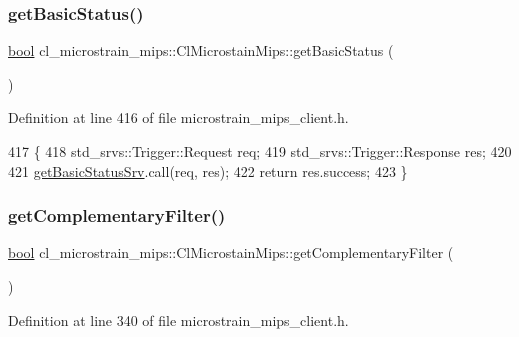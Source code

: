 \subsubsection{\texorpdfstring{get\+Basic\+Status()}{getBasicStatus()}}
{\footnotesize\ttfamily \hyperlink{classbool}{bool} cl\+\_\+microstrain\+\_\+mips\+::\+Cl\+Microstain\+Mips\+::get\+Basic\+Status (\begin{DoxyParamCaption}{ }\end{DoxyParamCaption})\hspace{0.3cm}{\ttfamily [inline]}}



Definition at line 416 of file microstrain\+\_\+mips\+\_\+client.\+h.


\begin{DoxyCode}
417     \{
418         std\_srvs::Trigger::Request req;
419         std\_srvs::Trigger::Response res;
420 
421         \hyperlink{classcl__microstrain__mips_1_1ClMicrostainMips_ab2d9efccc6237800a890135a4249eaf8}{getBasicStatusSrv}.call(req, res);
422         \textcolor{keywordflow}{return} res.success;
423     \}
\end{DoxyCode}
\mbox{\label{classcl__microstrain__mips_1_1ClMicrostainMips_aaff58eafdd41438a7af7c6adee3b2d5b}} 
\subsubsection{\texorpdfstring{get\+Complementary\+Filter()}{getComplementaryFilter()}}
{\footnotesize\ttfamily \hyperlink{classbool}{bool} cl\+\_\+microstrain\+\_\+mips\+::\+Cl\+Microstain\+Mips\+::get\+Complementary\+Filter (\begin{DoxyParamCaption}{ }\end{DoxyParamCaption})\hspace{0.3cm}{\ttfamily [inline]}}



Definition at line 340 of file microstrain\+\_\+mips\+\_\+client.\+h.


